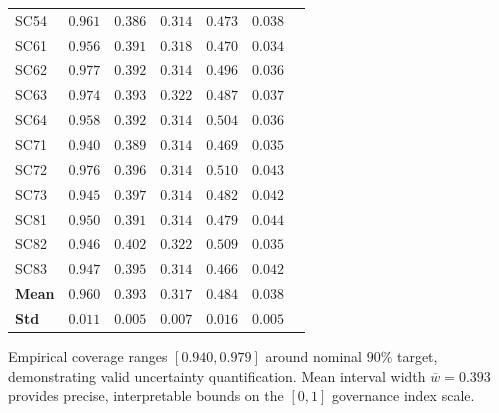 \begin{table}[!htbp]
\begin{tabular}{lcccccc}
SC54  & $0.961$ & $0.386$ & $0.314$ & $0.473$ & $0.038$ \\
SC61  & $0.956$ & $0.391$ & $0.318$ & $0.470$ & $0.034$ \\
SC62  & $0.977$ & $0.392$ & $0.314$ & $0.496$ & $0.036$ \\
SC63  & $0.974$ & $0.393$ & $0.322$ & $0.487$ & $0.037$ \\
SC64  & $0.958$ & $0.392$ & $0.314$ & $0.504$ & $0.036$ \\
SC71  & $0.940$ & $0.389$ & $0.314$ & $0.469$ & $0.035$ \\
SC72  & $0.976$ & $0.396$ & $0.314$ & $0.510$ & $0.043$ \\
SC73  & $0.945$ & $0.397$ & $0.314$ & $0.482$ & $0.042$ \\
SC81  & $0.950$ & $0.391$ & $0.314$ & $0.479$ & $0.044$ \\
SC82  & $0.946$ & $0.402$ & $0.322$ & $0.509$ & $0.035$ \\
SC83  & $0.947$ & $0.395$ & $0.314$ & $0.466$ & $0.042$ \\
\midrule
\textbf{Mean}  & $0.960$ & $0.393$ & $0.317$ & $0.484$ & $0.038$ \\
\textbf{Std}   & $0.011$ & $0.005$ & $0.007$ & $0.016$ & $0.005$ \\
\bottomrule
\end{tabular}
\begin{flushleft}
\footnotesize
Empirical coverage ranges $[0.940, 0.979]$ around nominal $90\%$ target, demonstrating valid uncertainty quantification.
Mean interval width $\overline{w} = 0.393$ provides precise, interpretable bounds on the $[0, 1]$ governance index scale.
\end{flushleft}
\end{table}


